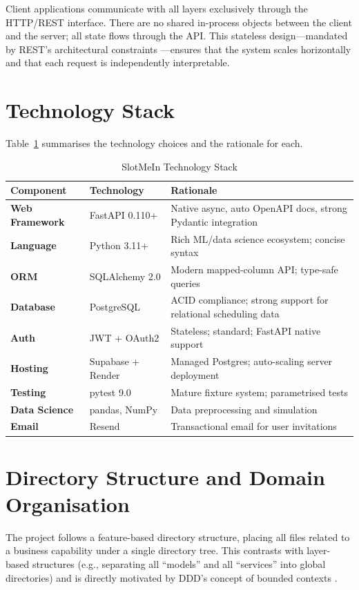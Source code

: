 Client applications communicate with all layers exclusively through the HTTP/REST interface. There are no shared in-process objects between the client and the server; all state flows through the API. This stateless design—mandated by REST's architectural constraints \cite{fielding_2000}—ensures that the system scales horizontally and that each request is independently interpretable.

\section{Technology Stack}

Table~\ref{tab:tech_stack} summarises the technology choices and the rationale for each.

\begin{table}[H]
\centering
\caption{SlotMeIn Technology Stack}
\label{tab:tech_stack}
\begin{tabular}{>{\bfseries}p{3.5cm} p{3.5cm} p{6cm}}
\toprule
Component & Technology & Rationale \\
\midrule
Web Framework & FastAPI 0.110+ & Native async, auto OpenAPI docs, strong Pydantic integration \\
Language & Python 3.11+ & Rich ML/data science ecosystem; concise syntax \\
ORM & SQLAlchemy 2.0 & Modern mapped-column API; type-safe queries \\
Database & PostgreSQL & ACID compliance; strong support for relational scheduling data \\
Auth & JWT + OAuth2 & Stateless; standard; FastAPI native support \\
Hosting & Supabase + Render & Managed Postgres; auto-scaling server deployment \\
Testing & pytest 9.0 & Mature fixture system; parametrised tests \\
Data Science & pandas, NumPy & Data preprocessing and simulation \\
Email & Resend & Transactional email for user invitations \\
\bottomrule
\end{tabular}
\end{table}

\section{Directory Structure and Domain Organisation}

The project follows a feature-based directory structure, placing all files related to a business capability under a single directory tree. This contrasts with layer-based structures (e.g., separating all ``models'' and all ``services'' into global directories) and is directly motivated by DDD's concept of bounded contexts \cite{evans_2003}.


